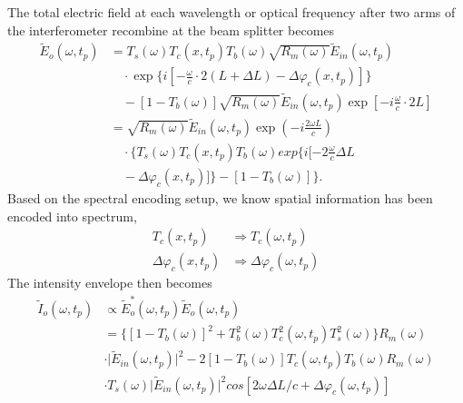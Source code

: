 \documentclass[aps,pra,reprint,superscriptaddress]{revtex4-1}
\begin{document}
The total electric field at each wavelength or optical frequency after two arms of the interferometer recombine at the beam splitter becomes
\begin{equation} \label{eq:totalElecField}
\begin{split}
\tilde{E}_o(\omega, t_p) &= T_s(\omega) T_c(x, t_p) T_b(\omega) \sqrt{R_m(\omega)} \tilde{E}_{in}(\omega, t_p) \\
&\quad \cdot \exp \Big\lbrace i[-\frac{\omega}{c} \cdot 2(L+\Delta L) - \Delta\varphi_c(x,t_p)] \Big\rbrace \\
&\quad - [1-T_b(\omega)] \sqrt{R_m(\omega)} \tilde{E}_{in}(\omega, t_p) \exp[- i \frac{\omega}{c}\cdot 2L] \\
&= \sqrt{R_m(\omega)} \tilde{E}_{in}(\omega, t_p) \exp(- i \frac{2\omega L}{c}) \\
&\quad \cdot \Big\lbrace T_s(\omega) T_c(x, t_p) T_b(\omega) exp \lbrace i[-2\frac{\omega}{c}\Delta L  \\
&\quad - \Delta\varphi_c(x,t_p)] \rbrace - [1-T_b(\omega)] \Big\rbrace.
\end{split}
\end{equation}
Based on the spectral encoding setup, we know spatial information has been encoded into spectrum,
\begin{align}
T_c(x,t_p) &\Rightarrow T_c(\omega,t_p)\\
\Delta\varphi_c(x,t_p) &\Rightarrow \Delta\varphi_c(\omega,t_p)
\end{align}
The intensity envelope then becomes
\begin{equation} \label{eq:totalIntensity}
\begin{split}
\tilde{I}_o(\omega, t_p) &\propto \tilde{E}_o^*(\omega, t_p) \tilde{E}_o(\omega, t_p) \\
&= \Big\lbrace [1-T_b(\omega)]^2 + T_b^2(\omega) T_c^2(\omega, t_p) T_s^2(\omega) \Big\rbrace R_m(\omega) \\
& \cdot \lvert\tilde{E}_{in}(\omega, t_p)\rvert^2 - 2 [1-T_b(\omega)] T_c(\omega, t_p) T_b(\omega) R_m(\omega) \\
& \cdot T_s(\omega) \lvert\tilde{E}_{in}(\omega, t_p)\rvert^2 cos[2\omega \Delta L / c + \Delta \varphi_c(\omega, t_p) ]
\end{split}
\end{equation}
\end{document}
